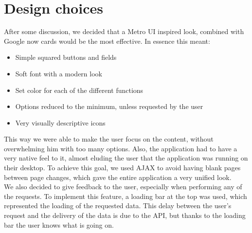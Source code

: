 \documentclass[a4paper]{article}
\begin{document}
\section{Design choices}
After some discussion, we decided that a Metro UI inspired look, combined with Google now cards would be the most effective. In essence this meant:
\begin{itemize}
\item Simple squared buttons and fields
\item Soft font with a modern look
\item Set color for each of the different functions
\item Options reduced to the minimum, unless requested by the user
\item Very visually descriptive icons
\end{itemize}
This way we were able to make the user focus on the content, without overwhelming him with too many options. Also, the application had to have a very native feel to it, almost eluding the user that the application was running on their desktop. To achieve this goal, we used AJAX to avoid having blank pages between page changes, which gave the entire application a very unified look.\\

We also decided to give feedback to the user, especially when performing any of the requests. To implement this feature, a loading bar at the top was used, which represented the loading of the requested data. This delay between the user's request and the delivery of the data is due to the API, but thanks to the loading bar the user knows what is going on. \\
\end{document}
